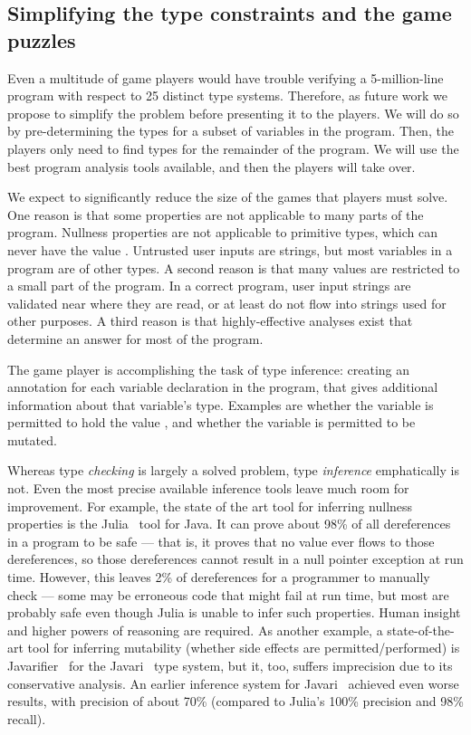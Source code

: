 \documentclass{sig-alternate}
\def\<#1>{\codeid{#1}}
\newcommand{\codeid}[1]{\ifmmode{\mbox{\ttfamily{#1}}}\else{\ttfamily #1}\fi}
\begin{document}
\subsection{Simplifying the type constraints and the game puzzles}
\label{sec:simplification}

Even a multitude of game players would have trouble verifying a
5-million-line program with respect to 25 distinct type systems.
Therefore, as future work we propose to simplify the problem before presenting it to the
players.  We will do so by pre-determining the types for a subset of
variables in the program.  Then, the players only need to find types for
the remainder of the program.  We will use the best program analysis tools
available, and then the players will take over.

We expect to significantly reduce the size of the games that players must
solve.  One reason is that some properties are not applicable to many parts
of the program.  Nullness properties are not applicable to primitive types,
which can never have the value \<null>.  Untrusted user inputs are strings,
but most variables in a program are of other types.  A second reason is
that many values are restricted to a small part of the program.  In a
correct program, user input strings are validated near where they are read,
or at least do not flow into strings used for other purposes.  A third
reason is that highly-effective analyses exist that determine an
answer for most of the program.

The game player is accomplishing the task of type inference:  creating an
annotation for each variable declaration in the program, that gives
additional information about that variable's type.  Examples are whether
the variable is permitted to hold the value \<null>, and whether the
variable is permitted to be mutated.

Whereas type \emph{checking} is largely a solved problem, type
\emph{inference} emphatically is not.
Even the most precise available inference tools leave much room for
improvement.  For example, the state of the art tool for inferring
nullness properties is the
Julia~\cite{julia-web-interface,Spoto2008,Spoto10:LPAR,Spoto10,SpotoE2011}
tool for Java.  It can prove about 98\% of all dereferences in a
program to be safe --- that is, it proves that no \<null> value ever
flows to those dereferences, so those dereferences cannot result in a
null pointer exception at run time.  However, this leaves 2\% of
dereferences for a programmer to manually check --- some may be
erroneous code that might fail at run time, but most are probably safe
even though Julia is unable to infer such properties.  Human
insight and higher powers of reasoning are required.  As another
example, a state-of-the-art tool for inferring mutability (whether
side effects are permitted/performed) is
Javarifier~\cite{Quinonez2008,QuinonezTE2008} for the
Javari~\cite{BirkaE2004,TschantzE2005,Tschantz2006} type system, but
it, too, suffers imprecision due to its conservative analysis.  An
earlier inference system for
Javari~\cite{GreenfieldboyceF2005,GreenfieldboyceF2007} achieved even
worse results, with precision of about 70\% (compared to Julia's 100\%
precision and 98\% recall).
\end{document}
